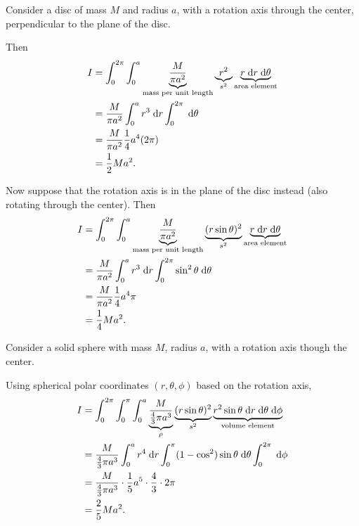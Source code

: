 \documentclass[a4paper]{article}
\begin{document}
\begin{eg}
  Consider a disc of mass $M$ and radius $a$, with a rotation axis through the center, perpendicular to the plane of the disc.

  \begin{center}
  \end{center}
  Then
  \begin{align*}
    I &= \int_{0}^{2\pi}\int_0^a \underbrace{\frac{M}{\pi a^2}}_{\text{mass per unit length}} \underbrace{r^2}_{s^2} \underbrace{r\;\mathrm{d} r\;\mathrm{d} \theta}_{\text{area element}}\\
    &= \frac{M}{\pi a^2}\int_0^a r^3\;\mathrm{d} r \int_0^{2\pi}\;\mathrm{d} \theta\\
    &= \frac{M}{\pi a^2}\frac{1}{4}a^4 (2\pi)\\
    &= \frac{1}{2}Ma^2.
  \end{align*}

  Now suppose that the rotation axis is in the plane of the disc instead (also rotating through the center). Then
  \begin{align*}
    I &= \int_{0}^{2\pi}\int_0^a \underbrace{\frac{M}{\pi a^2}}_{\text{mass per unit length}} \underbrace{(r\sin \theta)^2}_{s^2} \underbrace{r\;\mathrm{d} r\;\mathrm{d} \theta}_{\text{area element}}\\
    &= \frac{M}{\pi a^2}\int_0^a r^3\;\mathrm{d} r \int_0^{2\pi}\sin^2 \theta\;\mathrm{d} \theta\\
    &= \frac{M}{\pi a^2}\frac{1}{4}a^4 \pi\\
    &= \frac{1}{4}Ma^2.
  \end{align*}
\end{eg}
\begin{eg}
  Consider a solid sphere with mass $M$, radius $a$, with a rotation axis though the center.
  \begin{center}
  \end{center}
  Using spherical polar coordinates $(r, \theta, \phi)$ based on the rotation axis,
  \begin{align*}
    I &= \int_{0}^{2\pi}\int_0^\pi\int_0^a \underbrace{\frac{M}{\frac{4}{3}\pi a^3}}_{\rho}\underbrace{(r\sin \theta)^2}_{s^2} \underbrace{r^2\sin \theta\;\mathrm{d} r\;\mathrm{d} \theta\;\mathrm{d} \phi}_{\text{volume element}}\\
    &= \frac{M}{\frac{4}{3}\pi a^3}\int_0^a r^4 \;\mathrm{d} r\int_0^\pi (1 - \cos^2)\sin \theta\;\mathrm{d} \theta \int_0^{2\pi}\;\mathrm{d} \phi\\
    &= \frac{M}{\frac{4}{3}\pi a^3}\cdot \frac{1}{5}a^5 \cdot \frac{4}{3}\cdot 2\pi\\
    &= \frac{2}{5}Ma^2.
  \end{align*}
\end{eg}
\end{document}
